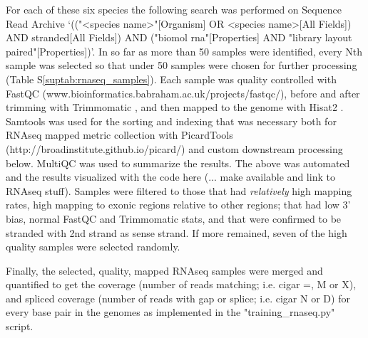 \documentclass{bioinfo}
\newcounter{suptab}
\begin{document}
\begin{methods}
For each of these six species the following search was performed on Sequence Read Archive
`(("<species name>"[Organism] OR <species name>[All Fields]) AND stranded[All Fields]) 
AND ("biomol rna"[Properties] AND "library layout paired"[Properties])'. In so far as 
more than 50 samples were identified, every Nth sample was selected so that under 50
samples were chosen for further processing (Table S\ref{suptab:rnaseq_samples}).
Each sample was quality controlled with FastQC (www.bioinformatics.babraham.ac.uk/projects/fastqc/), before and after trimming
with Trimmomatic \citep{bolger2014trimmomatic}, and then mapped to the genome with Hisat2 \citep{kim2019graph}. 
Samtools \citep{li2009sequence} was used for the sorting and indexing that was necessary both for
RNAseq mapped metric collection with PicardTools (http://broadinstitute.github.io/picard/) and custom downstream 
processing below. MultiQC \citep{ewels2016multiqc} was used to summarize the results. The above was 
automated and the results visualized with the code here (... make available and link to RNAseq stuff).
Samples were filtered to those that had {\it relatively} high mapping rates, high mapping to
exonic regions relative to other regions; that had low 3' bias, normal FastQC and 
Trimmomatic stats, and that
were confirmed to be stranded with 2nd strand as sense strand. If more remained, seven
of the high quality samples were selected randomly.

Finally, the selected, quality, mapped RNAseq samples were merged and quantified to
get the coverage (number of reads matching; i.e. cigar =, M or X),
and spliced coverage (number of reads with gap or splice; i.e. cigar N or D)
for every base pair in the genomes as implemented in the "training\_rnaseq.py"
script.

\end{methods}
\end{document}

